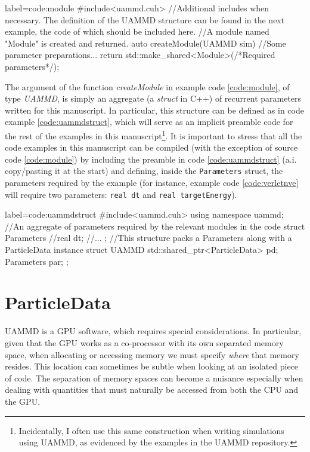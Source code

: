 \documentclass[twoside,openright,titlepage,numbers=noenddot,%
headinclude,footinclude,cleardoublepage=empty,abstract=on,
BCOR=5mm,fontsize=11pt, dvipsnames, paper=b5
]{scrreprt}
\def\ucpp{uammd_cpp_lexer.py:UAMMDCppLexer -x}
\newcommand{\uammd}{\gls{UAMMD}\xspace}
\newcommand{\gpu}{\gls{GPU}\xspace}
\begin{document}
\begin{code2}{label=code:module}
#include<uammd.cuh>
//Additional includes when necessary. The definition of the UAMMD structure can be found in the next example, the code of which should be included here.
//A module named "Module" is created and returned.
auto createModule(UAMMD sim){
  //Some parameter preparations...
  return std::make_shared<Module>(/*Required parameters*/);
}
\end{code2}

The argument of the function \emph{createModule} in example code \ref{code:module}, of type \emph{UAMMD}, is simply an aggregate (a \emph{struct} in C++) of recurrent parameters written for this manuscript. In particular, this structure can be defined as in code example \ref{code:uammdstruct}, which will serve as an implicit preamble code for the rest of the examples in this manuscript\footnote{Incidentally, I often use this same construction when writing simulations using \uammd, as evidenced by the examples in the UAMMD repository.}. It is important to stress that all the code examples in this manuscript can be compiled (with the exception of source code \ref{code:module}) by including the preamble in code \ref{code:uammdstruct} (a.i. copy/pasting it at the start) and defining, inside the \texttt{Parameters} struct, the parameters required by the example (for instance, example code \ref{code:verletnve} will require two parameters: \texttt{real dt} and \texttt{real targetEnergy}).

\begin{code2}
  {label=code:uammdstruct}
#include<uammd.cuh>
using namespace uammd; 
//An aggregate of parameters required by the relevant modules in the code
struct Parameters{
  //real dt;
  //...
};
//This structure packs a Parameters along with a ParticleData instance
struct UAMMD{
  std::shared_ptr<ParticleData> pd;
  Parameters par;
};
\end{code2}

\chapter{ParticleData}\label{sec:particledata}
\uammd is a \gpu software, which requires special considerations. In particular, given that the \gpu works as a co-processor with its own separated memory space, when allocating or accessing memory we must specify \emph{where} that memory resides. This location can sometimes be subtle when looking at an isolated piece of code. The separation of memory spaces can become a nuisance especially when dealing with quantities that must naturally be accessed from both the CPU and the \gpu.
\end{document}
